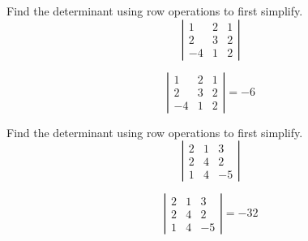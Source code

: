 \documentclass{ximera}
\begin{document}
\begin{problem}\label{prb:7.22} Find the determinant using row operations to first simplify.
\begin{equation*}
\left|
\begin{array}{rrr}
1 & 2 & 1 \\
2 & 3 & 2 \\
-4 & 1 & 2
\end{array}
\right|
\end{equation*}
\begin{hint}
\[
\left|
\begin{array}{rrr}
1 & 2 & 1 \\
2 & 3 & 2 \\
-4 & 1 & 2
\end{array}
\right| = -6
\]
\end{hint}
\end{problem}

\begin{problem}\label{prb:7.23} Find the determinant using row operations to first simplify.
\begin{equation*}
\left|
\begin{array}{rrr}
2 & 1 & 3 \\
2 & 4 & 2 \\
1 & 4 & -5
\end{array}
\right|
\end{equation*}
\begin{hint}
\[
\left|
\begin{array}{rrr}
2 & 1 & 3 \\
2 & 4 & 2 \\
1 & 4 & -5
\end{array}
\right| = -32
\]
\end{hint}
\end{problem}
\end{document}
